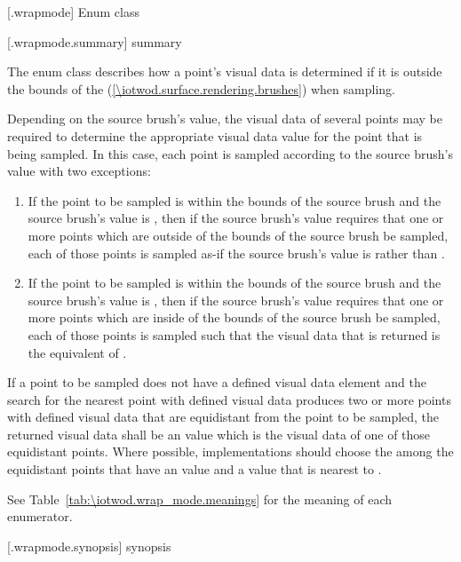  [\iotwod.wrapmode] {Enum class }

 [\iotwod.wrapmode.summary] { summary}

\pnum
The  enum class describes how a point's visual data is 
determined if it is outside the bounds of the  (\ref{\iotwod.surface.rendering.brushes}) when sampling.

\pnum
Depending on the source brush's  value, the visual data of several points may be required to determine the appropriate visual data value for the point that is being sampled. In this case, each point is sampled according to the source brush's  value with two exceptions:
\begin{enumerate}
\item If the point to be sampled is within the bounds of the source brush and the source brush's  value is , then if the source brush's  value requires that one or more points which are outside of the bounds of the source brush be sampled, each of those points is sampled as-if the source brush's  value is  rather than .
\item If the point to be sampled is within the bounds of the source brush and the source brush's  value is , then if the source brush's  value requires that one or more points which are inside of the bounds of the source brush be sampled, each of those points is sampled such that the visual data that is returned is the equivalent of .
\end{enumerate}

\pnum
If a point to be sampled does not have a defined visual data element and the search for the nearest point with defined visual data produces two or more points with defined visual data that are equidistant from the point to be sampled, the returned visual data shall be an \unspecnorm value which is the visual data of one of those equidistant points. Where possible, implementations should choose the among the equidistant points that have an \xaxis value and a \yaxis value that is nearest to .

\pnum
See Table~\ref{tab:\iotwod.wrap_mode.meanings} for the meaning of each  enumerator.

 [\iotwod.wrapmode.synopsis] { synopsis}

